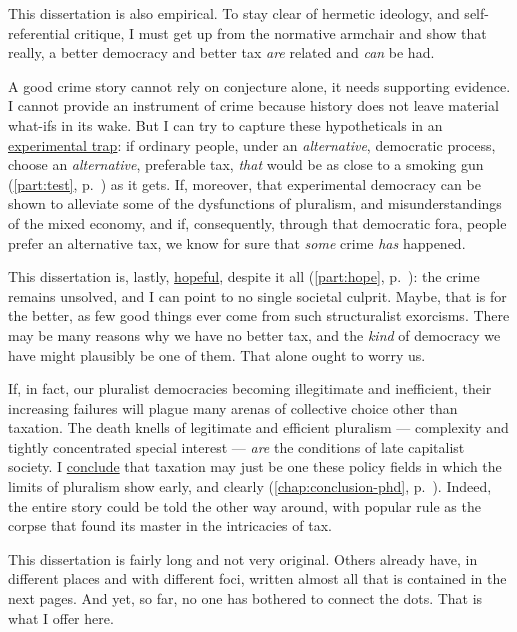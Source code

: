 This dissertation is also empirical.
To stay clear of hermetic ideology, and self-referential critique, I must get up from the normative armchair and show that really, a better democracy and better tax \emph{are} related and \emph{can} be had.

A good crime story cannot rely on conjecture alone, it needs supporting evidence.
I cannot provide an instrument of crime because history does not leave material what-ifs in its wake.
But I can try to capture these hypotheticals in an \hyperref[part:test]{experimental trap}:
if ordinary %
people, under an \emph{alternative}, democratic process, choose an \emph{alternative}, preferable tax, \emph{that} would be as close to a smoking gun (\autoref{part:test}, p.~\pageref{part:test}) as it gets.
If, moreover, that experimental democracy can be shown to alleviate some of the dysfunctions of pluralism, and misunderstandings of the mixed economy, and if, consequently, through that democratic fora, people prefer an alternative tax, we know for sure that \emph{some} crime \emph{has} happened.

This dissertation is, lastly, \hyperref[part:hope]{hopeful}, despite it all (\autoref{part:hope}, p.~\pageref{part:hope}):
the crime remains unsolved, and I can point to no single societal culprit.
Maybe, that is for the better, as few good things ever come from such structuralist exorcisms.
There may be many reasons why we have no better tax, and the \emph{kind} of democracy we have might plausibly be one of them.
That alone ought to worry us.

If, in fact, our pluralist democracies becoming illegitimate and inefficient, their increasing failures will plague many arenas of collective choice other than taxation.
The death knells of legitimate and efficient pluralism --- complexity and tightly concentrated special interest --- \emph{are} the conditions of late capitalist society.
I \hyperref[chap:conclusion-phd]{conclude} that taxation may just be one these policy fields in which the limits of pluralism show early, and clearly (\autoref{chap:conclusion-phd}, p.~\pageref{chap:conclusion-phd}).
Indeed, the entire story could be told the other way around, with popular rule as the corpse that found its master in the intricacies of tax.

This dissertation is fairly long and not very original.
Others already have, in different places and with different foci, written almost all that is contained in the next \pageref{end} pages.
And yet, so far, no one has bothered to connect the dots.
That is what I offer here.

